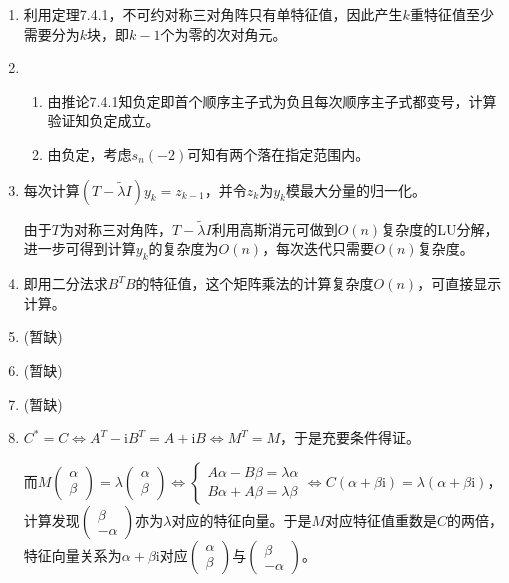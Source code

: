 \documentclass[a4paper,UTF8,fontset=windows]{ctexart}
\begin{document}
\begin{enumerate}
\item
利用定理7.4.1，不可约对称三对角阵只有单特征值，因此产生$k$重特征值至少需要分为$k$块，即$k-1$个为零的次对角元。

\item
\begin{enumerate}
\item
由推论7.4.1知负定即首个顺序主子式为负且每次顺序主子式都变号，计算验证知负定成立。

\item
由负定，考虑$s_n(-2)$可知有两个落在指定范围内。
\end{enumerate}

\item
每次计算$(T-\tilde{\lambda}I)y_k=z_{k-1}$，并令$z_k$为$y_k$模最大分量的归一化。

由于$T$为对称三对角阵，$T-\tilde{\lambda}I$利用高斯消元可做到$O(n)$复杂度的LU分解，进一步可得到计算$y_k$的复杂度为$O(n)$，每次迭代只需要$O(n)$复杂度。

\item
即用二分法求$B^TB$的特征值，这个矩阵乘法的计算复杂度$O(n)$，可直接显示计算。

\item
(暂缺)

\item
(暂缺)

\item
(暂缺)

\item
$C^*=C\Leftrightarrow A^T-\mathrm{i}B^T=A+\mathrm{i}B\Leftrightarrow M^T=M$，于是充要条件得证。

而$M\begin{pmatrix}\alpha\\\beta\end{pmatrix}=\lambda\begin{pmatrix}\alpha\\\beta\end{pmatrix}\Leftrightarrow\begin{cases}A\alpha-B\beta=\lambda\alpha\\B\alpha+A\beta=\lambda\beta\end{cases}\Leftrightarrow C(\alpha+\beta\mathrm{i})=\lambda(\alpha+\beta\mathrm{i})$，计算发现$\begin{pmatrix}\beta\\-\alpha\end{pmatrix}$亦为$\lambda$对应的特征向量。于是$M$对应特征值重数是$C$的两倍，特征向量关系为$\alpha+\beta\mathrm{i}$对应$\begin{pmatrix}\alpha\\\beta\end{pmatrix}$与$\begin{pmatrix}\beta\\-\alpha\end{pmatrix}$。
\end{enumerate}
\end{document}
